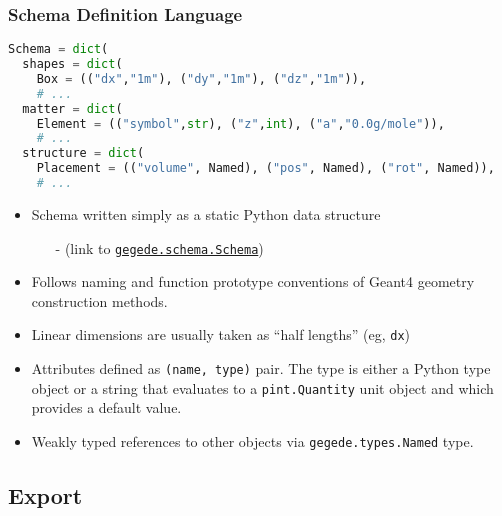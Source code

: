 \documentclass[10pt,xcolor=dvipsnames]{beamer}
\begin{document}
\begin{frame}[fragile]
  \frametitle{Schema Definition Language} 
  \begin{lstlisting}[language=Python]
Schema = dict(
  shapes = dict(
    Box = (("dx","1m"), ("dy","1m"), ("dz","1m")),
    # ...
  matter = dict(
    Element = (("symbol",str), ("z",int), ("a","0.0g/mole")),
    # ...
  structure = dict(
    Placement = (("volume", Named), ("pos", Named), ("rot", Named)),
    # ...
  \end{lstlisting}

  \footnotesize
  \begin{itemize}
  \item Schema written simply as a static Python data structure
    \begin{itemize}\scriptsize
    \item[-] (link to \href{https://github.com/brettviren/gegede/blob/master/python/gegede/schema/__init__.py}{\texttt{gegede.schema.Schema}})
    \end{itemize}
  \item Follows naming and function prototype conventions of Geant4 geometry construction methods.
    
  \item Linear dimensions are usually taken as ``half lengths'' (eg, \texttt{dx})
  \item Attributes defined as \texttt{(name, type)} pair.  The type is either a
    Python type object or a string that evaluates to a \texttt{pint.Quantity} unit object and which provides a default value.
    \item Weakly typed references to other objects via \texttt{gegede.types.Named} type.
  \end{itemize}
\end{frame}


\subsection{Export}
\end{document}
